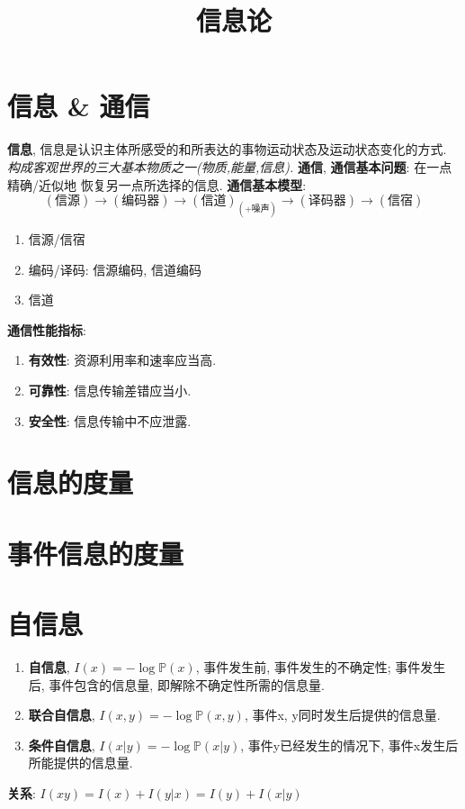 \documentclass{article}
\title{信息论}\date{} \linespread{1.25}
\newcommand{\env}[2]{\begin{#1}#2\end{#1}}
\newcommand{\defi}[2]{\textbf{#1}, #2}
\newcommand{\P}{\mathbb P}
\begin{document}
\maketitle
\tableofcontents

\section{信息 \& 通信}
    \defi{信息}{信息是认识主体所感受的和所表达的事物运动状态及运动状态变化的方式. \textit{构成客观世界的三大基本物质之一(物质,能量,信息).}}
    \defi{通信}
        \textbf{通信基本问题}: 在一点精确/近似地   恢复另一点所选择的信息.
        \textbf{通信基本模型}:
            $$(\text{信源}) \to (\text{编码器}) \to (\text{信道})_{(+\text{噪声})} \to (\text{译码器}) \to (\text{信宿})$$
            \env{enumerate}{
                \item 信源/信宿
                \item 编码/译码: 信源编码, 信道编码
                \item 信道
            }
        \textbf{通信性能指标}: 
            \env{enumerate}{
                \item \textbf{有效性}: 资源利用率和速率应当高.
                \item \textbf{可靠性}: 信息传输差错应当小.
                \item \textbf{安全性}: 信息传输中不应泄露.
            }

\section{信息的度量}
    \section{事件信息的度量}
        \section{自信息}
            \env{enumerate}{
                \item \defi{自信息}{$I(x) = -\log \P(x)$, 事件发生前, 事件发生的不确定性; 事件发生后, 事件包含的信息量, 即解除不确定性所需的信息量.}
                \item \defi{联合自信息}{$I(x, y) = -\log \P(x, y)$, 事件x, y同时发生后提供的信息量.}
                \item \defi{条件自信息}{$I(x|y) = -\log \P(x|y)$, 事件y已经发生的情况下, 事件x发生后所能提供的信息量.}
            }
            \textbf{关系}: $I(xy) = I(x) + I(y|x) = I(y) + I(x|y)$
\end{document}
